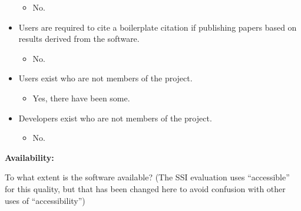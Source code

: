 \begin{itemize}
  \begin{itemize}
  \itemsep1pt\parskip0pt
  \item
    No.
  \end{itemize}
\item
  Users are required to cite a boilerplate citation if publishing papers
  based on results derived from the software.

  \begin{itemize}
  \itemsep1pt\parskip0pt
  \item
    No.
  \end{itemize}
\item
  Users exist who are not members of the project.

  \begin{itemize}
  \itemsep1pt\parskip0pt
  \item
    Yes, there have been some.
  \end{itemize}
\item
  Developers exist who are not members of the project.

  \begin{itemize}
  \itemsep1pt\parskip0pt
  \item
    No.
  \end{itemize}
\end{itemize}

\textbf{Availability:}

To what extent is the software available? (The SSI evaluation uses
``accessible'' for this quality, but that has been changed here to avoid
confusion with other uses of ``accessibility'')

